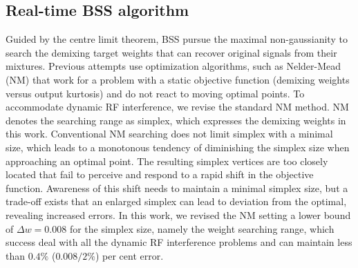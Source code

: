 \documentclass[pdflatex,mathphys]{sty}%
\begin{document}

\subsection{Real-time BSS algorithm}
Guided by the centre limit theorem, BSS pursue the maximal non-gaussianity to search the demixing target weights that can recover original signals from their mixtures. Previous attempts \cite{zhang2022broadband,ma2020blind} use optimization algorithms, such as Nelder-Mead (NM) \cite{nelder1965simplex} that work for a problem with a static objective function (demixing weights versus output kurtosis) and do not react to moving optimal points. To accommodate dynamic RF interference, we revise the standard NM method. NM denotes the searching range as simplex, which expresses the demixing weights in this work. Conventional NM searching does not limit simplex with a minimal size, which leads to a monotonous tendency of diminishing the simplex size when approaching an optimal point. The resulting simplex vertices are too closely located that fail to perceive and respond to a rapid shift in the objective function. Awareness of this shift needs to maintain a minimal simplex size, but a trade-off exists that an enlarged simplex can lead to deviation from the optimal, revealing increased errors. In this work, we revised the NM setting a lower bound of $\Delta w = 0.008$ for the simplex size, namely the weight searching range, which success deal with all the dynamic RF interference problems and can maintain less than $0.4\%$ ($0.008/2\%$) per cent error.
\end{document}
